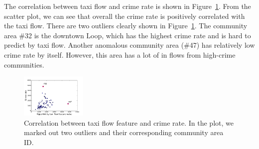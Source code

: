 The correlation between taxi flow and crime rate is shown in Figure~\ref{fig:taxi-corr}. From the scatter plot, we can see that overall the crime rate is positively correlated with the taxi flow. There are two  outliers clearly shown in Figure~\ref{fig:taxi-corr}. The community area \#32 is the downtown Loop, which has the highest crime rate and is hard to predict by taxi flow. Another anomalous community area (\#47) has relatively low crime rate by itself. However, this area has a lot of in flows from high-crime communities. 




\begin{figure}[ht]
\centering
\includegraphics[width=0.28\textwidth]{fig/taxi-flow-percent.pdf}
\caption{Correlation between taxi flow feature and crime rate. In the plot, we marked out two outliers and their corresponding community area ID.}
\label{fig:taxi-corr}
\end{figure}




